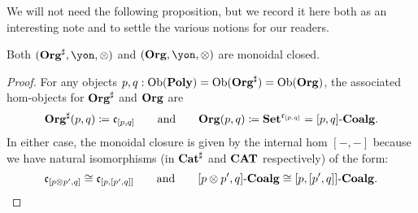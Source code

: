 We will not need the following proposition, but we record it here both as an interesting note and to settle the various notions for our readers.
\begin{proposition}
Both $(\org^\sharp,\yon,\otimes)$ and $(\org,\yon,\otimes)$ are monoidal closed.
\end{proposition}
\begin{proof}
For any objects $p,q:\operatorname{Ob}(\mathbf{Poly})=\operatorname{Ob}(\mathbf{Org}^\sharp)=\operatorname{Ob}(\mathbf{Org})$, the associated hom-objects for $\mathbf{Org}^\sharp$ and $\mathbf{Org}$ are
\[
  \mathbf{Org}^\sharp(p,q)\coloneqq\mathfrak{c}_{[p,q]}
  \qquad \textnormal{and} \qquad
	\mathbf{Org}(p,q)\coloneqq\mathbf{Set}^{\mathfrak{c}_{[p,q]}}=[p,q]\textnormal{-}\mathbf{Coalg}.
\]
In either case, the monoidal closure is given by the internal hom $[-,-]$ because we have natural isomorphisms (in $\mathbf{Cat}^{\sharp}$ and $\mathbf{CAT}$ respectively) of the form:
\[
	\mathfrak{c}_{[p\otimes p',q]}\cong\mathfrak{c}_{[p,[p',q]]}
	\qquad \textnormal{and} \qquad
	[p\otimes p',q]\textnormal{-}\mathbf{Coalg}\cong[p,[p',q]]\textnormal{-}\mathbf{Coalg}.
	\qedhere
\]
\end{proof}

